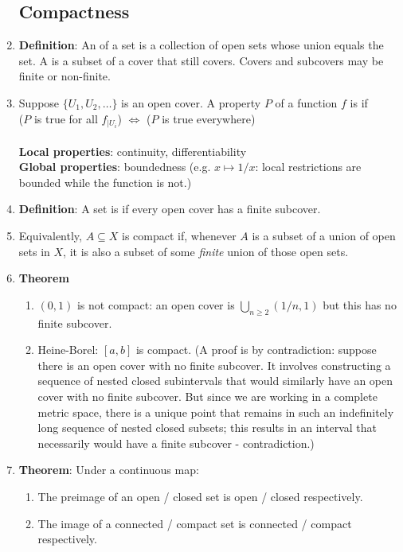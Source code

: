 \begin{enumerate}
\subsection{Compactness}
\item {\bf Definition}: An  of a set is a collection of open sets whose union
  equals the set. A  is a subset of a cover that still covers. Covers and subcovers
  may be finite or non-finite.
\item Suppose $\{U_1, U_2, \ldots\}$ is an open cover. A property $P$ of a function $f$ is  if\\
  ($P$ is true for all $f_{|U_i}$) $\iff$ ($P$ is true everywhere)\\~\\
  {\bf Local properties}: continuity, differentiability\\
  {\bf Global properties}: boundedness (e.g. $x \mapsto 1/x$: local restrictions are bounded while
  the function is not.)
\item {\bf Definition}: A set is  if every open cover has a finite subcover.
\item Equivalently, $A \subseteq X$ is compact if, whenever $A$ is a subset of a union of open sets
  in $X$, it is also a subset of some {\it finite} union of those open sets.
\item {\bf Theorem}
  \begin{enumerate}[label=(\roman*)]
  \item $(0, 1)$ is not compact: an open cover is $\bigcup_{n \geq 2} (1/n, 1)$ but this has no
    finite subcover.
  \item Heine-Borel: $[a, b]$ is compact. (A proof is by contradiction: suppose there is an open
    cover with no finite subcover. It involves constructing a sequence of nested closed
    subintervals that would similarly have an open cover with no finite subcover. But since we are
    working in a complete metric space, there is a unique point that remains in such an
    indefinitely long sequence of nested closed subsets; this results in an interval that
    necessarily would have a finite subcover - contradiction.)
  \end{enumerate}
\item {\bf Theorem}: Under a continuous map:
  \begin{enumerate}[label=(\roman*)]
  \item The preimage of an open / closed set is open / closed respectively.
  \item The image of a connected / compact set is connected / compact respectively.

\end{enumerate}
\end{enumerate}
